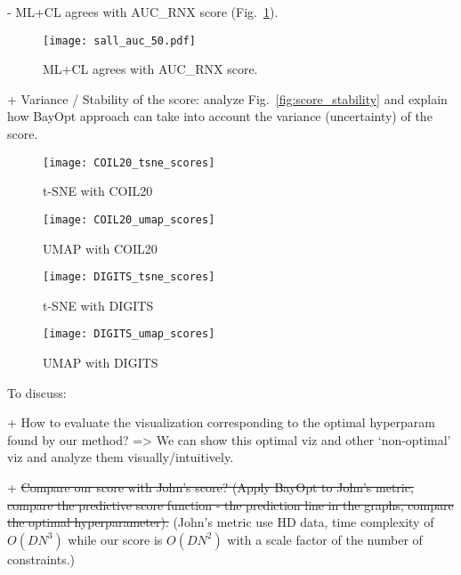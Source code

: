 \hspace{10pt }- ML+CL agrees with AUC\_RNX score (Fig.~\ref{fig:sall}).
\begin{figure}
\centering
\texttt{[image: sall\_auc\_50.pdf]}
\caption{ML+CL agrees with AUC\_RNX score.}\label{fig:sall}
\end{figure}

\vspace{8pt} \par
+ Variance / Stability of the score: analyze Fig.~\ref{fig:score_stability} and explain how BayOpt approach can take into account the variance (uncertainty) of the score.

\begin{figure*}
     \centering
     \begin{subfigure}[b]{0.24\textwidth}
         \centering
         \texttt{[image: COIL20\_tsne\_scores]}
         \caption{t-SNE with COIL20}
         \label{fig:s3}
     \end{subfigure}
     \hfill
     \begin{subfigure}[b]{0.24\textwidth}
         \centering
         \texttt{[image: COIL20\_umap\_scores]}
         \caption{UMAP with COIL20}
         \label{fig:s4}
     \end{subfigure}
     \hfill
     \begin{subfigure}[b]{0.24\textwidth}
         \centering
         \texttt{[image: DIGITS\_tsne\_scores]}
         \caption{t-SNE with DIGITS}
         \label{fig:s1}
     \end{subfigure}
     \hfill
     \begin{subfigure}[b]{0.24\textwidth}
         \centering
         \texttt{[image: DIGITS\_umap\_scores]}
         \caption{UMAP with DIGITS}
         \label{fig:s2}
     \end{subfigure}
     \caption{Stability of the constraint preserving scores with two methods t-SNE and UMAP for two datasets COIL20 and DIGITS}
     \label{fig:score_stability}
\end{figure*}


\vspace{8pt} \par
To discuss:

+ How to evaluate the visualization corresponding to the optimal hyperparam found by our method? => We can show this optimal viz and other `non-optimal' viz and analyze them visually/intuitively.

+ \st{Compare our score with John's score? (Apply BayOpt to John's metric, compare the predictive score function - the prediction line in the graphs, compare the optimal hyperparameter).}
(John's metric use HD data, time complexity of $O(DN^3)$ while our score is $O(DN^2)$ with a scale factor of the number of constraints.)

